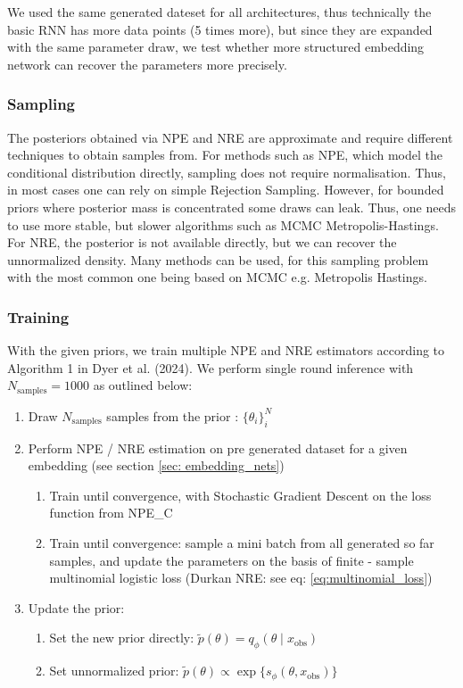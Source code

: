 \documentclass[12pt]{article}
\begin{document}
We used the same generated dateset for all architectures, thus technically the basic RNN has more data points (5 times more), but since they are expanded with the same parameter draw, we test whether more structured embedding network can recover the parameters more precisely. 

\subsubsection*{Sampling}
The posteriors obtained via NPE and NRE are approximate and require different techniques to obtain samples from. For methods such as NPE, which model the conditional distribution directly, sampling does not require normalisation. Thus, in most cases one can rely on simple Rejection Sampling. However, for bounded priors where posterior mass is concentrated some draws can leak. Thus, one needs to use more stable, but slower algorithms such as MCMC Metropolis-Hastings. For NRE, the posterior is not available directly, but we can recover the unnormalized density. Many methods can be used, for this sampling problem with the most common one being based on MCMC e.g. Metropolis Hastings.


\subsubsection*{Training}
With the given priors, we train multiple NPE and NRE estimators according to Algorithm 1 in Dyer et al. (2024). We perform single round inference with $N_\text{samples} = 1000$ as outlined below:
\begin{enumerate}
    \item Draw $N_\text{samples}$ samples from the prior : $\{ \theta_i \}_i^N$
    
    \item Perform NPE / NRE estimation on pre generated dataset for a given embedding (see section \ref{sec: embedding_nets})
    \begin{enumerate}
        \item [NPE: ] Train until convergence, with Stochastic Gradient Descent on the loss function from NPE\_C
        \item [NRE: ] Train until convergence: sample a mini batch from all generated so far samples, and update the parameters on the basis of finite - sample multinomial logistic loss (Durkan NRE: see eq: \eqref{eq:multinomial_loss})
    \end{enumerate}
    
    \item Update the prior:
    \begin{enumerate}
        \item [NPE: ] Set the new prior directly: $\tilde{p}(\theta) = q_\phi(\theta \mid x_\text{obs})$
        \item [NRE: ] Set unnormalized prior: $\tilde{p}(\theta) \propto \exp \{ s_\phi(\theta, x_\text{obs}) \}$
    \end{enumerate}
\end{enumerate}
\end{document}
